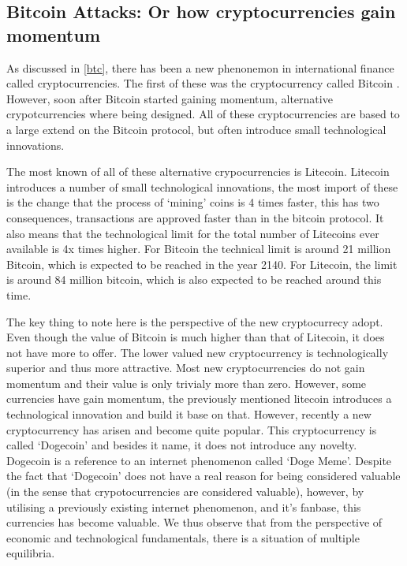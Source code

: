 \documentclass[a4paper]{report}
\begin{document}
\begin{refsection}
\chapter{Bitcoin Attacks: Or how cryptocurrencies gain momentum}
As discussed in \autoref{btc}, there has been a new phenonemon in international finance called cryptocurrencies. The first of these was the cryptocurrency called Bitcoin \parencite{nakamoto2008bitcoin}. However, soon after Bitcoin started gaining momentum, alternative crypotcurrencies where being designed. All of these cryptocurrencies are based to a large extend on the Bitcoin protocol, but often introduce small technological innovations.

The most known of all of these alternative crypocurrencies is Litecoin. Litecoin introduces a number of small technological innovations, the most import of these is the change that the process of `mining' coins is 4 times faster, this has two consequences, transactions are approved faster than in the bitcoin protocol. It also means that the technological limit for the total number of Litecoins ever available is 4x times higher. For Bitcoin the technical limit is around 21 million Bitcoin, which is expected to be reached in the year 2140. For Litecoin, the limit is around 84 million bitcoin, which is also expected to be reached around this time.

The key thing to note here is the perspective of the new cryptocurrecy adopt. Even though the value of Bitcoin is much higher than that of Litecoin, it does not have more to offer. The lower valued new cryptocurrency is technologically superior and thus more attractive. Most new cryptocurrencies do not gain momentum and their value is only trivialy more than zero. However, some currencies have gain momentum, the previously mentioned litecoin introduces a technological innovation and build it base on that. However, recently a new cryptocurrency has arisen and become quite popular. This cryptocurrency is called `Dogecoin' and besides it name, it does not introduce any novelty. Dogecoin is a reference to an internet phenomenon called `Doge Meme'. Despite the fact that `Dogecoin' does not have a real reason for being considered valuable (in the sense that crypotocurrencies are considered valuable), however, by utilising a previously existing internet phenomenon, and it's fanbase, this currencies has become valuable. We thus observe that from the perspective of economic and technological fundamentals, there is a situation of multiple equilibria.


\end{refsection}
\end{document}
